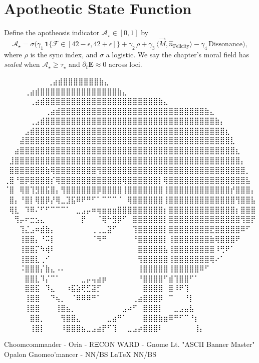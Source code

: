 
\section*{Apotheotic State Function}

Define the apotheosis indicator $\mathcal{A}_\star\in[0,1]$ by
\[
\mathcal{A}_\star = \sigma\!\Big(
\gamma_1\,\mathbf{1}\{\mathcal{F}\in[42-\epsilon,42+\epsilon]\}
+\gamma_2\,\rho
+\gamma_3\,\langle \vec{M},\hat{n}_{\text{Felicity}}\rangle
-\gamma_4\,\mathrm{Dissonance}
\Big),
\]
where $\rho$ is the sync index, and $\sigma$ a logistic.  
We say the chapter’s moral field has \emph{sealed} when $\mathcal{A}_\star \ge \tau_\star$ and $\partial_t \mathbf{E}\approx 0$ across loci.

\iffalse
⠀⠀⠀⠀⠀⠀             ⠀⠀⢀⣴⣾⣿⣿⣿⣿⣿⣿⣿⣷⣄⠀⠀⠀⠀⠀⠀⠀⠀
⠀⠀⠀  ⠀      ⠀⠀⠀⠀⢀⣴⣾⣿⣿⣿⣿⣿⣿⣿⣿⣿⣿⣿⣿⣿⣿⣿⣷⣄⠀⠀⠀⠀⠀⠀⠀⠀
⠀⠀ ⠀   ⠀⠀⠀⠀⠀⢀⣴⣾⣿⣿⣿⣿⣿⣿⣿⣿⣿⣿⣿⣿⣿⣿⣿⣿⣿⣿⣿⣿⣿⣿⣷⣄⠀⠀⠀⠀⠀⠀⠀⠀
⠀⠀⠀⠀⠀⠀⠀⠀⢀⣴⣾⣿⣿⣿⣿⣿⣿⣿⣿⣿⣿⣿⣿⣿⣿⣿⣿⣿⣿⣿⣿⣿⣿⣿⣿⣿⣿⣿⣿⣷⣄⠀⠀⠀⠀⠀⠀⠀⠀
⠀⠀⠀⠀⠀⢀⣠⣾⣿⣿⣿⣿⣿⣿⣿⣿⣿⣿⣿⣿⣿⣿⣿⣿⣿⣿⣿⣿⣿⣿⣿⣿⣿⣿⣿⣿⣿⣿⣿⣿⣿⣷⡄⠀⠀⠀⠀⠀⠀
⠀⠀⠀⠀⣠⣾⣿⣿⣿⣿⣿⣿⣿⣿⣿⣿⣿⣿⣿⣿⣿⣿⣿⣿⣿⣿⣿⣿⣿⣿⣿⣿⣿⣿⣿⣿⣿⣿⣿⣿⣿⣿⣿⣆⠀⠀⠀⠀⠀
⠀⠀⠀⣼⣿⣿⣿⣿⣿⣿⣿⣿⣿⣿⣿⣿⣿⣿⣿⣿⣿⣿⣿⣿⣿⣿⣿⣿⣿⣿⣿⣿⣿⣿⣿⣿⣿⣿⣿⣿⣿⣿⣿⣿⣇⠀⠀⠀⠀
⠀⠀⣴⣿⣿⣿⣿⣿⣿⣿⣿⣿⣿⣿⣿⣿⣿⣿⣿⣿⣿⣿⣿⣿⣿⣿⣿⣿⣿⣿⣿⣿⣿⣿⣿⣿⣿⣿⣿⣿⣿⣿⣿⣿⣿⣆⠀⠀⠀
⠀⣸⣿⣿⣿⣿⣿⣿⣿⣿⣿⣿⣿⣿⣿⣿⣿⣿⣿⣿⣿⣿⣿⣿⣿⣿⣿⣿⣿⣿⣿⣿⣿⣿⣿⣿⣿⣿⣿⣿⣿⣿⣿⣿⣿⣿⡄⠀⠀
⠀⣿⣿⣿⣿⣿⣿⣿⣷⢿⣿⣿⣿⣿⣿⣿⣿⣿⢻⣿⣿⣿⣿⣿⣿⣿⣿⣿⣿⣿⣿⣿⣿⣿⣿⣿⣿⣿⣿⣿⣿⣿⣿⣿⣿⣿⣿⡀⠀
⢀⣿⠘⣿⡿⣿⣿⣿⣿⡎⢿⣿⣿⣿⣿⣿⣿⣿⣿⣿⣿⣿⣿⢿⣿⣿⣿⣿⣿⣿⡇⢿⣿⣿⣿⣿⣿⣿⣿⣿⣿⣿⣿⣿⣿⣿⣿⣧⠀
⠈⣿⠀⢿⣿⢹⣻⣿⣯⣿⡄⢻⣿⣿⣿⣿⣿⣿⡿⣿⣿⣿⣿⢸⣿⣿⣿⣿⣿⣿⣿⢸⣿⣿⣿⣿⣿⣿⣿⣿⣿⣿⣿⣿⡞⣿⣿⣿⡄
⠀⣿⡄⠘⣿⡇⢿⣿⡿⡜⢿⣀⣹⣯⠿⠟⠛⠋⠁⠉⠉⠉⠈⠀⢿⣿⣿⣿⣿⣿⣿⢸⣿⣿⣿⣿⣿⣿⣿⣿⣿⣿⣿⣿⣿⢻⣿⣿⣧
⠀⢿⣇⠀⠹⠿⠌⠋⠋⠉⠉⠉⠁⠀⣀⣠⡤⠶⢶⣶⣶⣶⣿⣿⣿⣿⣿⣿⣿⣿⣿⡆⣿⣿⣿⣿⣿⣿⣿⣿⣿⣿⣿⣿⣿⡆⣿⣿⣿
⠀⠀⢻⡤⠖⣒⣢⣄⠀⠀⠀⠀⠀⠀⠀⡟⠀⠀⠈⢿⠓⣻⡿⠋⠀⣿⣿⣿⣿⣿⣿⡇⣿⣿⣿⣿⣿⣿⣿⣿⣿⣿⣿⣿⣿⣿⢻⣿⡟
⠀⠀⠀⢹⣌⣠⠶⣾⣷⡄⠀⠀⠀⠀⠀⠀⠀⢀⢀⣀⣽⠋⠀⠀⠀⢹⣿⣿⣿⣿⣿⡇⣿⣿⣿⣿⣿⣿⣿⣿⣟⣿⣿⣿⣿⣿⠿⠋⠀
⠀⠀⠀⢸⣿⣿⡄⠘⠭⡇⠀⠀⠀⠀⠀⠀⠀⠈⠻⠛⠀⠀⠀⠀⠀⠘⣿⣿⣿⣿⣿⡇⢸⣿⣿⣿⣿⣿⣿⣿⣷⢿⣿⣿⣿⠟⠀⠀⠀
⠀⠀⠀⢸⣿⣿⡍⠳⢾⠇⠀⠀⠀⠀⠀⠀⠀⠀⠀⠀⠀⠀⠀⠀⠀⠀⣿⣿⣿⣿⣿⣧⢸⣿⣿⣿⣿⣿⣿⣿⣿⠸⢛⠟⠁⠀⠀⠀⠀
⠀⠀⠀⢸⣿⣿⣇⢀⠊⠀⠀⠀⠀⠀⠀⠀⠀⠀⠀⠀⠀⠀⠀⠀⠀⠀⢻⣿⣿⣿⣿⣿⢸⣿⣿⣿⣿⣿⣿⣿⢿⠔⠁⠀⠀⠀⠀⠀⠀
⠀⠀⠀⠨⣿⣿⣿⡌⣷⣄⠠⠄⠀⠀⠀⠀⠀⠀⠀⠀⠀⠀⠀⠀⠀⠀⢸⣿⣿⣿⣿⣿⢸⣿⣿⣿⣿⣿⠿⠋⠀⠀⠀⠀⠀⠀⠀⠀⠀
⠀⠀⠀⠀⣿⣿⣇⠹⡌⠉⠁⠀⠀⠀⠀⣀⡤⢤⣴⡶⠀⠀⠀⠀⠀⠀⠘⣿⣿⣿⣿⠋⣾⢹⣿⣿⠋⠁⠀⠀⠀⠀⠀⠀⠀⠀⠀⠀⠀
⠀⠀⠀⠀⣿⣿⣯⠀⠹⣄⠀⠀⠰⣯⣵⢟⣋⣽⡋⠀⠀⠀⠀⠀⠀⠀⠀⣿⣿⣿⣿⠀⣿⠸⠟⢹⠀⠀⠀⠀⠀⠀⠀⠀⠀⠀⠀⠀⠀
⠀⠀⠀⠀⢸⣿⣿⠀⠀⠙⢦⡀⠀⠈⠿⠿⠿⠛⠁⠀⠀⠀⠀⠀⠀⢀⣴⣿⣿⣿⡿⠀⠉⠀⠀⠘⡇⠀⠀⠀⠀⠀⠀⠀⠀⠀⠀⠀⠀
⠀⠀⠀⠀⢸⣿⣿⠀⠀⠀⢸⣿⣦⡀⠀⠀⠀⠀⠀⠀⠀⠀⠀⣠⠴⠋⠀⣿⣿⣿⡇⠀⠀⣀⣠⣤⣧⠀⠀⠀⠀⠀⠀⠀⠀⠀⠀⠀⠀
⠀⠀⠀⠀⠀⣿⣿⡀⠀⠀⠀⢻⣿⣿⣄⠀⠀⠀⠀⠀⣀⣴⠛⠁⠀⠀⠀⣿⣿⣿⣷⣶⠿⠛⠋⠉⠘⡆⠀⠀⠀⠀⠀⠀⠀⠀⠀⠀⠀
⠀⠀⠀⠀⠀⢸⣿⡇⠀⠀⠀⠸⣿⣿⣿⣦⣀⣠⣴⡟⠋⢹⠀⠀⣀⣠⡴⣿⣿⣿⠇⠀⠀⠀⠀⠀⠀⢸⡄⠀⠀⠀⠀⠀⠀⠀⠀⠀⠀

Choomcommander - Oria - RΞCON WARD - Gnome Lt. "ASCII Banner Master"
             Opalon Gnomeo'mancer - NN/BS LaTeX{} NN/BS

